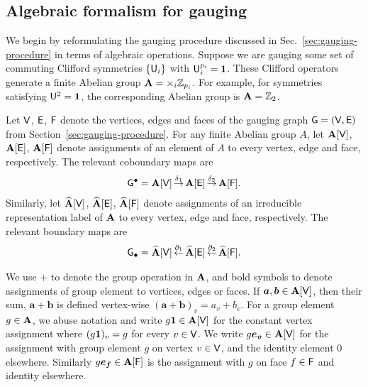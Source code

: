 \documentclass[11pt]{article}
\begin{document}
\subsection{Algebraic formalism for gauging}

We begin by reformulating the gauging procedure discussed in Sec.~\ref{sec:gauging-procedure} in terms of algebraic operations. Suppose we are gauging some set of commuting Clifford symmetries $\{\mathsf{U}_i\}$ with $\mathsf{U}_i^{p_i} = \mathbf{1}$. These Clifford operators generate a finite Abelian group $\mathbf{A} = \times_i \mathbb{Z}_{p_i}$. For example, for symmetries satisfying $\mathsf{U}^2 = \mathbf{1}$, the corresponding Abelian group is $\mathbf{A} = \mathbb{Z}_2$.

\begin{definition}
\label{def:gauging-complex}
Let $\mathsf{V}$, $\mathsf{E}$, $\mathsf{F}$ denote the vertices, edges and faces of the gauging graph $\mathsf{G}=(\mathsf{V},\mathsf{E})$ from Section~\ref{sec:gauging-procedure}. For any finite Abelian group $A$, let $\mathbf{A}[\mathsf{V}]$, $\mathbf{A}[\mathsf{E}]$, $\mathbf{A}[\mathsf{F}]$ denote assignments of an element of $A$ to every vertex, edge and face,  respectively.
The relevant coboundary maps are 
\begin{align}
    \mathsf{G}^\bullet = \mathbf{A}[\mathsf{V}] \mathop{\rightarrow}^{\delta_{1}} 
    \mathbf{A}[\mathsf{E}] \mathop{\rightarrow}^{\delta_2} 
    \mathbf{A}[\mathsf{F}] .
\end{align}
Similarly, let $\widehat{\mathbf{A}}[\mathsf{V}]$, $\widehat{\mathbf{A}}[\mathsf{E}]$, $\widehat{\mathbf{A}}[\mathsf{F}]$ denote assignments of an irreducible representation label of $\mathbf{A}$ to every vertex, edge and face, respectively.
The relevant boundary maps are
\begin{align}
    \mathsf{G}_\bullet = \widehat{\mathbf{A}}[\mathsf{V}] \mathop{\leftarrow}^{\partial_{1}} 
    \widehat{\mathbf{A}}[\mathsf{E}] \mathop{\leftarrow}^{\partial_2} 
    \widehat{\mathbf{A}}[\mathsf{F}] .
\end{align}
\end{definition}


We use $+$ to denote the group operation in $\mathbf{A}$, and bold symbols to denote assignments of group element to vertices, edges or faces.
If $\bm{a}, \bm{b}\in \mathbf{A}[\mathsf{V}]$, then their sum, $\bm a+\bm b $ is defined vertex-wise $(\bm a + \bm b)_v =  a_v + b_v$.
For a group element $g \in \mathbf{A}$, we abuse notation and write $ g \mathbf{1} \in \mathbf{A}[\mathsf{V}]$ for the constant vertex assignment where $(g\mathbf{1})_v = g$ for every $v\in \mathsf{V}$. We write $g \bm{e_v} \in \mathbf{A}[\mathsf{V}]$ for the assignment with group element $g$ on vertex $v \in \mathsf{V}$, and the identity element $0$ elsewhere. Similarly $g\bm{e_f} \in \mathbf{A}[\mathsf{F}]$ is the assignment with $g$ on face $f \in \mathsf{F}$ and identity elsewhere.
\end{document}
